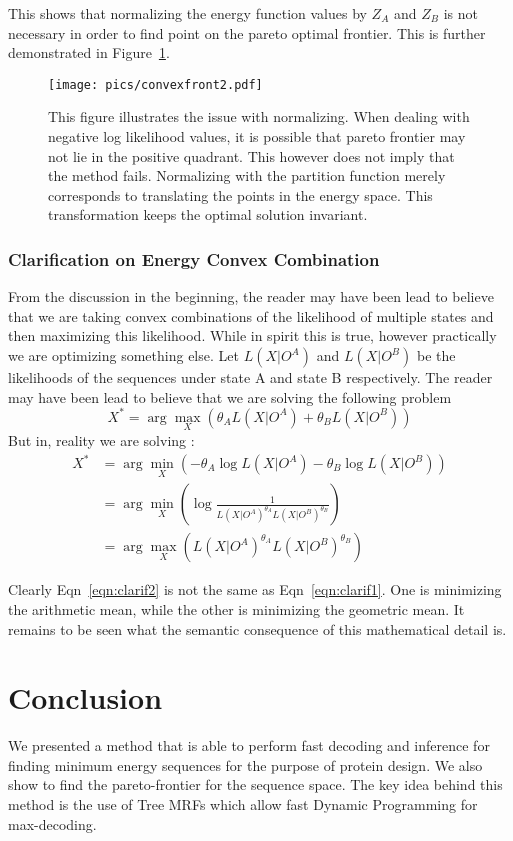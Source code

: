 \documentclass{article}
\begin{document}
This shows that normalizing the energy function values by $Z_A$ and $Z_B$ is not necessary in order to find point on the pareto optimal frontier. This is further demonstrated in Figure~\ref{fig:cvxfront2}.

\begin{figure}[h!]
    \centering
    \texttt{[image: pics/convexfront2.pdf]}
    \caption{This figure illustrates the issue with normalizing. When dealing with negative log likelihood values, it is possible that pareto frontier may not lie in the positive quadrant. This however does not imply that the method fails. Normalizing with the partition function merely corresponds to translating the points in the energy space. This transformation keeps the optimal solution invariant.  }
    \label{fig:cvxfront2}
\end{figure}
\pagebreak


\subsubsection{Clarification on Energy Convex Combination}
From the discussion in the beginning, the reader may have been lead to believe that we are taking convex combinations of the likelihood of multiple states and then maximizing this likelihood. While in spirit this is true, however practically we are optimizing something else. Let $L(X|O^A)$  and $L(X|O^B)$ be the likelihoods of the sequences under state A and state B respectively. The reader may have been lead to believe that we are solving the following problem
\begin{equation}
\label{eqn:clarif1}
X^* = \arg \max_X \left( \theta_A L(X|O^A) + \theta_B L(X|O^B) \right)
\end{equation}
But in, reality we are solving : 
\begin{align}
X^* &= \arg \min_X \left( -\theta_A \log L(X|O^A) - \theta_B \log L(X|O^B) \right) \\
&= \arg \min_X \left( \log \frac{1}{L(X|O^A)^{\theta_A} L(X|O^B)^{\theta_B}} \right) \\
&= \arg \max_X \left( L(X|O^A)^{\theta_A} L(X|O^B)^{\theta_B} \right)
\label{eqn:clarif2} 
\end{align}

Clearly Eqn~\ref{eqn:clarif2} is not the same as Eqn~\ref{eqn:clarif1}. One is minimizing the arithmetic mean, while the other is minimizing the geometric mean. It remains to be seen what the semantic consequence of this mathematical detail is. 

\section{Conclusion}
We presented a method that is able to perform fast decoding and inference for finding minimum energy sequences for the purpose of protein design. We also show to find the pareto-frontier for the sequence space. The key idea behind this method is the use of Tree MRFs which allow fast Dynamic Programming for max-decoding.



\end{document}
